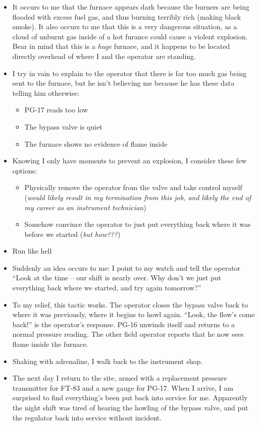 \begin{itemize}
\vskip 10pt
\item{} It occurs to me that the furnace appears dark because the burners are being flooded with excess fuel gas, and thus burning terribly rich (making black smoke).  It also occurs to me that this is a very dangerous situation, as a cloud of unburnt gas inside of a hot furance could cause a violent explosion.  Bear in mind that this is a {\it huge} furnace, and it happens to be located directly overhead of where I and the operator are standing.
\vskip 10pt
\item{} I try in vain to explain to the operator that there is far too much gas being sent to the furnace, but he isn't believing me because he has these data telling him otherwise:
\begin{itemize}

\item{} PG-17 reads too low
\item{} The bypass valve is quiet
\item{} The furnace shows no evidence of flame inside
\end{itemize}
\vskip 10pt
\item{} Knowing I only have moments to prevent an explosion, I consider these few options:
\begin{itemize}

\item{} Physically remove the operator from the valve and take control myself ({\it would likely result in my termination from this job, and likely the end of my career as an instrument technician})
\item{} Somehow convince the operator to just put everything back where it was before we started ({\it but how???})
\end{itemize}
\item{} Run like hell
\vskip 10pt
\item{} Suddenly an idea occurs to me: I point to my watch and tell the operator ``Look at the time -- our shift is nearly over.  Why don't we just put everything back where we started, and try again tomorrow?''
\vskip 10pt
\item{} To my relief, this tactic works.  The operator closes the bypass valve back to where it was previously, where it begins to howl again.  ``Look, the flow's come back!'' is the operator's response.  PG-16 unwinds itself and returns to a normal pressure reading.  The other field operator reports that he now sees flame inside the furnace.
\vskip 10pt
\item{} Shaking with adrenaline, I walk back to the instrument shop.
\vskip 10pt
\item{} The next day I return to the site, armed with a replacement pressure transmitter for FT-83 and a new gauge for PG-17.  When I arrive, I am surprised to find everything's been put back into service for me.  Apparently the night shift was tired of hearing the howling of the bypass valve, and put the regulator back into service without incident.
\end{itemize}

